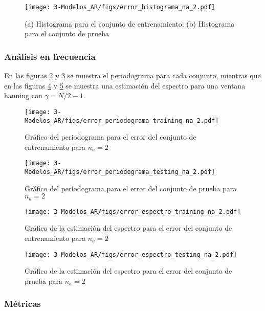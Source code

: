 \begin{figure}[H]
	\centering
	\texttt{[image: 3-Modelos\_AR/figs/error\_histograma\_na\_2.pdf]}
	\caption{(a) Histograma para el conjunto de entrenamiento; (b) Histograma para el conjunto de prueba}
	\label{fig:M3_histograma_error_na2}
\end{figure}

\subsubsection*{Análisis en frecuencia}


En las figuras \ref{fig:M3_error_periodograma_train_na2} y \ref{fig:M3_error_periodograma_test_na2} se muestra el periodograma para cada conjunto, mientras que en las figuras \ref{fig:M3_error_espectro_train_na2} y \ref{fig:M3_error_espectro_test_na2} se muestra una estimación del espectro para una ventana hanning con $\gamma = N/2 - 1$.


\begin{figure}[H]
	\centering
	\texttt{[image: 3-Modelos\_AR/figs/error\_periodograma\_training\_na\_2.pdf]}
	\caption{Gráfico del periodograma para el error del conjunto de entrenamiento para $n_a = 2$}
	\label{fig:M3_error_periodograma_train_na2}
\end{figure}

\begin{figure}[H]
	\centering
	\texttt{[image: 3-Modelos\_AR/figs/error\_periodograma\_testing\_na\_2.pdf]}
	\caption{Gráfico del periodograma para el error del conjunto de prueba para $n_a = 2$}
	\label{fig:M3_error_periodograma_test_na2}
\end{figure}

\begin{figure}[H]
	\centering
	\texttt{[image: 3-Modelos\_AR/figs/error\_espectro\_training\_na\_2.pdf]}
	\caption{Gráfico de la estimación del espectro para el error del conjunto de entrenamiento para $n_a = 2$}
	\label{fig:M3_error_espectro_train_na2}
\end{figure}

\begin{figure}[H]
	\centering
	\texttt{[image: 3-Modelos\_AR/figs/error\_espectro\_testing\_na\_2.pdf]}
	\caption{Gráfico de la estimación del espectro para el error del conjunto de prueba para $n_a = 2$}
	\label{fig:M3_error_espectro_test_na2}
\end{figure}

\subsubsection*{Métricas}

